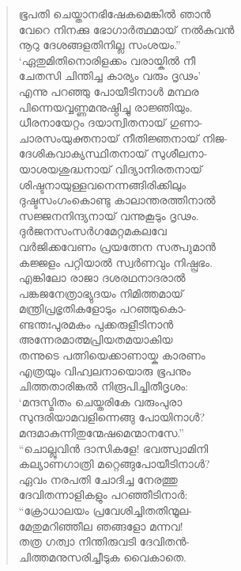 \begin{verse}
ഭൂപതി ചെയ്താനഭിഷേകമെങ്കില്‍ ഞാന്‍\\
വേറെ നിനക്കു ഭോഗാര്‍ത്ഥമായ് നല്‍കുവന്‍\\
നൂറു ദേശങ്ങളതിനില്ല സംശയം.”\\
‘ഏതുമിതിനൊരിളക്കം വരായ്കില്‍ നീ\\
ചേതസി ചിന്തിച്ച കാര്യം വരും ദൃഢം’\\
എന്നു പറഞ്ഞു പോയീടിനാള്‍ മന്ഥര\\
പിന്നെയവ്വണ്ണമനുഷ്ഠിച്ചു രാജ്ഞിയും.\\
ധീരനായേറ്റം ദയാന്വിതനായ് ഗുണാ-\\
ചാരസംയുക്തനായ് നീതിജ്ഞനായ് നിജ-\\
ദേശികവാക്യസ്ഥിതനായ് സുശീലനാ-\\
യാശയശുദ്ധനായ് വിദ്യാനിരതനായ്\\
ശിഷ്ടനായുള്ളവനെന്നങ്ങിരിക്കിലും\\
ദുഷ്ടസംഗംകൊണ്ടു കാലാന്തരത്തിനാല്‍\\
സജ്ജനനിന്ദ്യനായ് വന്നുകൂടും ദൃഢം.\\
ദുര്‍ജനസംസര്‍ഗമേറ്റമകലവേ\\
വര്‍ജിക്കവേണം പ്രയത്നേന സത്പുമാന്‍\\
കജ്ജളം പറ്റിയാല്‍ സ്വര്‍ണവും നിഷ്പ്രഭം.\\
എങ്കിലോ രാജാ ദശരഥനാദരാല്‍\\
പങ്കജനേത്രാഭ്യുദയം നിമിത്തമായ്\\
മന്ത്രിപ്രഭൃതികളോടും പറഞ്ഞുകൊ-\\
ണ്ടന്തഃപുരമകം പുക്കരുളീടിനാന്‍\\
അന്നേരമാത്മപ്രിയതമയാകിയ\\
തന്നുടെ പത്നിയെക്കാണായ്ക കാരണം\\
എത്രയും വിഹ്വലനായൊരു ഭൂപനും\\
ചിത്തതാരിങ്കല്‍ നിരൂപിച്ചിതീദൃശം:\\
‘മന്ദസ്മിതം ചെയ്തരികേ വരുംപുരാ\\
സുന്ദരിയാമവളിന്നെങ്ങു പോയിനാള്‍?\\
മന്ദമാകുന്നിതുന്മേഷമെന്മാനസേ.”\\
“ചൊല്ലുവിന്‍ ദാസികളേ! ഭവത്സ്വാമിനി\\
കല്യാണഗാത്രി മറ്റെങ്ങുപോയീടിനാള്‍?\\
ഏവം നരപതി ചോദിച്ച നേരത്തു\\
ദേവിതന്നാളികളും പറഞ്ഞീടിനാര്‍:\\
“ക്രോധാലയം പ്രവേശിച്ചിതതിന്മൂല-\\
മേതുമറിഞ്ഞീല ഞങ്ങളോ മന്നവ!\\
തത്ര ഗത്വാ നിന്തിരുവടി ദേവിതന്‍-\\
ചിത്തമനുസരിച്ചീടുക വൈകാതെ.\\

\end{verse}

